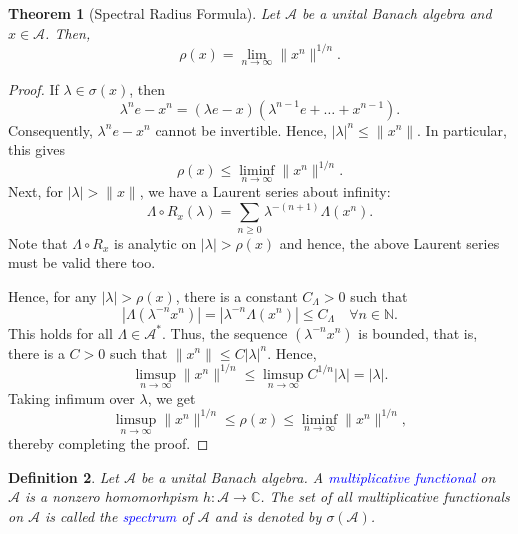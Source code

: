 \documentclass[12pt]{article}
\theoremstyle{thmstyle}
\newtheorem{theorem}{Theorem}[section]
\theoremstyle{defstyle}
\newtheorem{definition}[theorem]{Definition}
\newcommand{\N}{\mathbb{N}}
\newcommand{\bbC}{\mathbb{C}}
\newcommand{\calA}{\mathcal{A}} %
\newcommand{\define}[1]{\textcolor{blue}{\textit{#1}}}
\renewcommand{\le}{\leqslant}
\renewcommand{\ge}{\geqslant}
\begin{document}
\begin{theorem}[Spectral Radius Formula]
    Let $\calA$ be a unital Banach algebra and $x\in\calA$. Then, 
    \begin{equation*}
        \rho(x) = \lim_{n\to\infty}\|x^n\|^{1/n}.
    \end{equation*}
\end{theorem}
\begin{proof}
    If $\lambda\in\sigma(x)$, then 
    \begin{equation*}
        \lambda^ne - x^n = (\lambda e - x)\left(\lambda^{n - 1}e + \dots + x^{n - 1}\right).
    \end{equation*}
    Consequently, $\lambda^n e - x^n$ cannot be invertible. Hence, $|\lambda|^n\le\|x^n\|$. In particular, this gives 
    \begin{equation*}
        \rho(x)\le\liminf_{n\to\infty} \|x^n\|^{1/n}.
    \end{equation*}
    Next, for $|\lambda| > \|x\|$, we have a Laurent series about infinity: 
    \begin{equation*}
        \Lambda\circ R_x(\lambda) = \sum_{n\ge 0}\lambda^{-(n + 1)}\Lambda(x^n).
    \end{equation*}
    Note that $\Lambda\circ R_x$ is analytic on $|\lambda| > \rho(x)$ and hence, the above Laurent series must be valid there too.

    Hence, for any $|\lambda| > \rho(x)$, there is a constant $C_\Lambda > 0$ such that 
    \begin{equation*}
        |\Lambda(\lambda^{-n}x^n)| = |\lambda^{-n}\Lambda(x^n)|\le C_\Lambda\quad\forall n\in\N.
    \end{equation*}
    This holds for all $\Lambda\in\calA^\ast$. Thus, the sequence $(\lambda^{-n}x^n)$ is bounded, that is, there is a $C > 0$ such that $\|x^n\|\le C|\lambda|^n$. Hence, 
    \begin{equation*}
        \limsup_{n\to\infty}\|x^n\|^{1/n}\le\limsup_{n\to\infty} C^{1/n}|\lambda| = |\lambda|.
    \end{equation*}
    Taking infimum over $\lambda$, we get 
    \begin{equation*}
        \limsup_{n\to\infty}\|x^n\|^{1/n}\le\rho(x)\le\liminf_{n\to\infty}\|x^n\|^{1/n},
    \end{equation*}
    thereby completing the proof.
\end{proof}

\begin{definition}
    Let $\calA$ be a unital Banach algebra. A \define{multiplicative functional} on $\calA$ is a \emph{nonzero} homomorhpism $h:\calA\to\bbC$. The set of all multiplicative functionals on $\calA$ is called the \define{spectrum} of $\calA$ and is denoted by $\sigma(\calA)$.
\end{definition}
\end{document}
